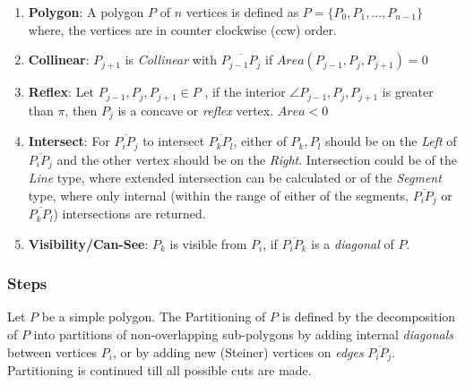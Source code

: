 \begin{enumerate}
[noitemsep,topsep=2pt,parsep=2pt,partopsep=2pt,leftmargin=*]
\item {\bf Polygon}: A polygon $P$ of $n$ vertices is defined as $P = \{P_0,P_1,...,P_{n-1}\}$ where, the vertices are in counter clockwise (ccw) order. 

\item {\bf Collinear}: $P_{j+1}$ is {\em Collinear} with $ \overline{P_{j-1} P_j}$ if $Area( P_{j-1}, P_j,  P_{j+1}) = 0$ 

\item {\bf Reflex}: Let  $ P_{j-1}, P_j,  P_{j+1} \in P$ , if the interior $\angle P_{j-1}, P_j,  P_{j+1}$ is greater than $\pi$,  then $P_j$  is a concave or {\em reflex} vertex. $Area < 0$

\item {\bf Intersect}: For  $\overline{P_i P_j}$ to intersect $\overline{P_k P_l}$, either of $P_k, P_l$ should be on the {\em Left} of  $\overline{P_i P_j}$ and the other vertex should be on the {\em Right}. Intersection could be of the {\em Line} type, where extended intersection can be calculated or of  the {\em Segment} type, where only internal (within the range of either of the segments, $\overline{P_i P_j}$ or $\overline{P_k P_l}$) intersections are returned.

\item {\bf Visibility/Can-See}: $P_k$ is visible from $P_i$, if $\overline{P_i P_k}$ is a {\em diagonal} of $P$. 

\end{enumerate}

\subsubsection{Steps}
Let $P$ be a simple polygon.  The Partitioning of $P$ is defined by the decomposition of $P$ into partitions of non-overlapping sub-polygons by adding internal {\em diagonals} between vertices  $P_i$, or by adding new (Steiner) vertices on {\em edges} $\overline{P_i P_j}$. Partitioning is continued till all possible cuts are made.

\bigskip

